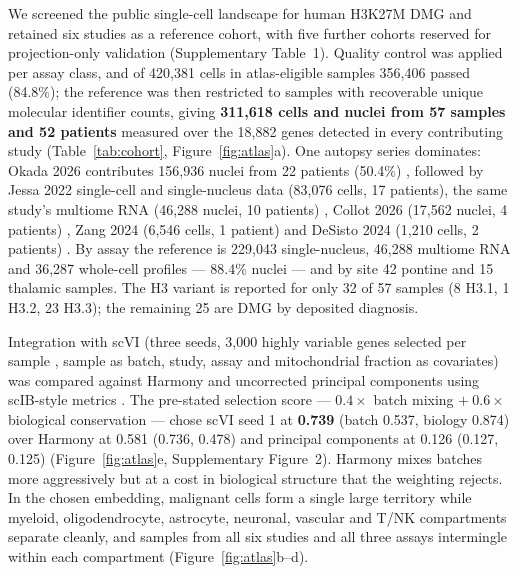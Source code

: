 \documentclass[12pt,a4paper]{article}
\begin{document}
We screened the public single-cell landscape for human H3K27M DMG and retained six studies as a reference cohort, with
five further cohorts reserved for projection-only validation (Supplementary Table~1). Quality control was applied per
assay class, and of 420,381 cells in atlas-eligible samples 356,406 passed (84.8\%); the reference was then restricted
to samples with recoverable unique molecular identifier counts, giving \textbf{311,618 cells and nuclei from 57 samples
and 52 patients} measured over the 18,882 genes detected in every contributing study (Table~\ref{tab:cohort},
Figure~\ref{fig:atlas}a). One autopsy series dominates: Okada 2026 contributes 156,936 nuclei from 22 patients
(50.4\%) \citep{okada2026singlenucleus}, followed by Jessa 2022 single-cell and single-nucleus data (83,076 cells, 17
patients), the same study's multiome RNA (46,288 nuclei, 10 patients) \citep{jessa2022km}, Collot 2026 (17,562 nuclei,
4 patients) \citep{collot2026igsfvista}, Zang 2024 (6,546 cells, 1 patient) \citep{zang2024singlecell} and DeSisto
2024 (1,210 cells, 2 patients) \citep{desisto2024tumor}. By assay the reference is 229,043 single-nucleus, 46,288
multiome RNA and 36,287 whole-cell profiles --- 88.4\% nuclei --- and by site 42 pontine and 15 thalamic samples. The
H3 variant is reported for only 32 of 57 samples (8 H3.1, 1 H3.2, 23 H3.3); the remaining 25 are DMG by deposited
diagnosis.

Integration with scVI \citep{lopez2018deep} (three seeds, 3,000 highly variable genes selected per sample
\citep{stuart2019comprehensive}, sample as batch, study, assay and mitochondrial fraction as covariates) was compared
against Harmony \citep{korsunsky2019fast} and uncorrected principal components using scIB-style metrics
\citep{luecken2021benchmarking}. The pre-stated selection score --- $0.4 \times$ batch mixing $+\ 0.6 \times$
biological conservation --- chose scVI seed 1 at \textbf{0.739} (batch 0.537, biology 0.874) over Harmony at 0.581
(0.736, 0.478) and principal components at 0.126 (0.127, 0.125) (Figure~\ref{fig:atlas}e, Supplementary Figure~2).
Harmony mixes batches more aggressively but at a cost in biological structure that the weighting rejects. In the chosen
embedding, malignant cells form a single large territory while myeloid, oligodendrocyte, astrocyte, neuronal, vascular
and T/NK compartments separate cleanly, and samples from all six studies and all three assays intermingle within each
compartment (Figure~\ref{fig:atlas}b--d).
\end{document}
